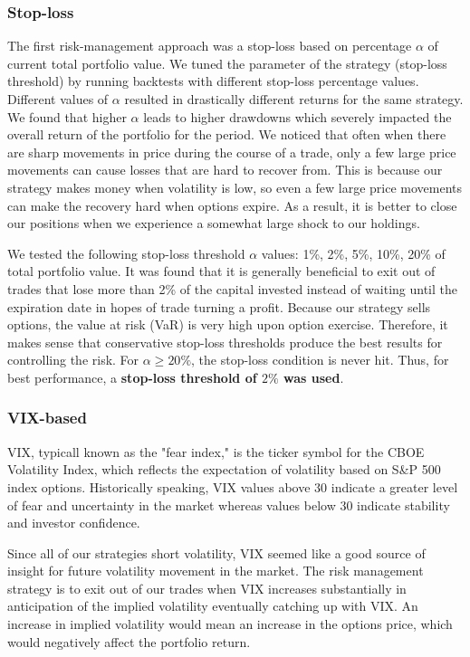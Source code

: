 \documentclass[10pt]{article}
\theoremstyle{definition}
\begin{document}
\subsubsection{Stop-loss}
The first risk-management approach was a stop-loss based on percentage $\alpha$ of current total portfolio value. We tuned the parameter of the strategy (stop-loss threshold) by running backtests with different stop-loss percentage values. Different values of $\alpha$ resulted in drastically different returns for the same strategy. We found that higher $\alpha$ leads to higher drawdowns which severely impacted the overall return of the portfolio for the period. We noticed that often when there are sharp movements in price during the course of a trade, only a few large price movements can cause losses that are hard to recover from. This is because our strategy makes money when volatility is low, so even a few large price movements can make the recovery hard when options expire. As a result, it is better to close our positions when we experience a somewhat large shock to our holdings.

We tested the following stop-loss threshold $\alpha$ values: 1\%, 2\%, 5\%, 10\%, 20\% of total portfolio value. It was found that it is generally beneficial to exit out of trades that lose more than 2\% of the capital invested instead of waiting until the expiration date in hopes of trade turning a profit. Because our strategy sells options, the value at risk (VaR) is very high upon option exercise. Therefore, it makes sense that conservative stop-loss thresholds produce the best results for controlling the risk. For $\alpha \geq 20\%$, the stop-loss condition is never hit. Thus, for best performance, a \textbf{stop-loss threshold of $2\%$ was used}.

\subsubsection{VIX-based}
VIX, typicall known as the "fear index," is the ticker symbol for the CBOE Volatility Index, which reflects the expectation of volatility based on S\&P 500 index options. Historically speaking, VIX values above 30 indicate a greater level of fear and uncertainty in the market whereas values below 30 indicate stability and investor confidence. 

Since all of our strategies short volatility, VIX seemed like a good source of insight for future volatility movement in the market. The risk management strategy is to exit out of our trades when VIX increases substantially in anticipation of the implied volatility eventually catching up with VIX. An increase in implied volatility would mean an increase in the options price, which would negatively affect the portfolio return. 
\end{document}
